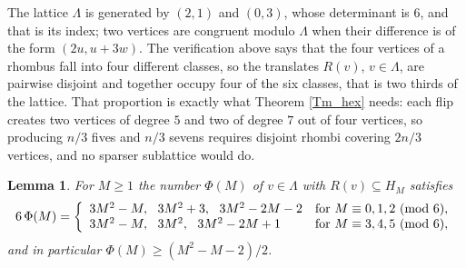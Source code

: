 \documentclass[10pt,a4paper]{article}
\newtheorem{lemma}[theorem]{Lemma}
\begin{document}
The lattice $\Lambda $ is generated by $(2,1)$ and $(0,3)$, whose determinant is
$6$, and that is its index; two vertices are congruent modulo $\Lambda $ when
their difference is of the form $(2u,u+3w)$. The verification above says that
the four vertices of a rhombus fall into four different classes, so the
translates $R(v)$, $v\in \Lambda $, are pairwise disjoint and together occupy
four of the six classes, that is two thirds of the lattice. That proportion is
exactly what Theorem \ref{Tm_hex} needs: each flip creates two vertices of
degree $5$ and two of degree $7$ out of four vertices, so producing $n/3$ fives
and $n/3$ sevens requires disjoint rhombi covering $2n/3$ vertices, and no
sparser sublattice would do.
%



\begin{lemma}
\label{Lemma_rhombi}For $M\geq 1$ the number $\Phi (M)$ of $v\in \Lambda $ with
$R(v)\subseteq H_{M}$ satisfies
\[
6\,\Phi (M)=\left\{
\begin{array}
[c]{ll}%
3M^{2}-M,\ \ 3M^{2}+3,\ \ 3M^{2}-2M-2 & \text{for }M\equiv 0,1,2\ (\mathrm{mod}\ 6),\\
3M^{2}-M,\ \ 3M^{2},\ \ 3M^{2}-2M+1 & \text{for }M\equiv 3,4,5\ (\mathrm{mod}\ 6),
\end{array}
\right.
\]
and in particular $\Phi (M)\geq (M^{2}-M-2)/2$.
\end{lemma}
\end{document}
